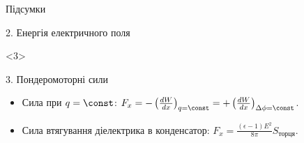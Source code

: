 \documentclass[onlytextwidth]{beamer}
\begin{document}
\begin{frame}{Підсумки}{}
\begin{onlyenv}
\begin{block}{2. Енергія електричного поля}
    \end{block}
\end{onlyenv}
\begin{onlyenv}<3>
    \begin{block}{3. Пондеромоторні сили}
        \begin{itemize}
            \item Сила при \(q = \const\): $ F_x = - \left( \frac{dW}{dx} \right)_{q = \const} =
            + \left( \frac{dW}{dx} \right)_{\Delta\phi = \const}$.
            \item Сила втягування діелектрика в конденсатор: $	F_x = \frac{(\epsilon -1)E^2}{8\pi}
            S_\text{торця}.$
        \end{itemize}
    \end{block}
\end{onlyenv}
\end{frame}
\end{document}
